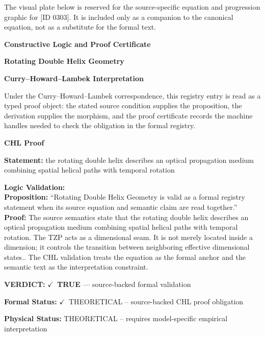 \begingroup\footnotesize\sloppy
The visual plate below is reserved for the source-specific equation and progression graphic for [ID 0303]. It is included only as a companion to the canonical equation, not as a substitute for the formal text.
\par\endgroup
\ifTZPDarkEdition
{}
\fi

\clearpage
\begingroup\tzpsupportsetup
\noindent\textbf{\fontsize{10.8pt}{12.8pt}\selectfont [ID 0303] Constructive Logic and Proof Certificate}\par
\noindent\textbf{\fontsize{10pt}{12pt}\selectfont Rotating Double Helix Geometry}\par
\vspace{0.45em}
\begingroup
\footnotesize
\setlength{\parskip}{0.22em}
\setlength{\parindent}{0pt}
\noindent\textbf{Curry--Howard--Lambek Interpretation}\par
Under the Curry--Howard--Lambek correspondence, this registry entry is read as a typed proof
object: the stated source condition supplies the proposition, the derivation supplies the
morphism, and the proof certificate records the machine handles needed to check the obligation
in the formal registry.

\vspace{0.45em}
\noindent\textbf{CHL Proof}\par
\textbf{Statement:} the rotating double helix describes an optical propagation medium combining spatial
helical paths with temporal rotation

\textbf{Logic Validation:}\\
\textbf{Proposition:} ``Rotating Double Helix Geometry is valid as a formal registry statement when its source
equation and semantic claim are read together.''\\
\textbf{Proof:} The source semantics state that the rotating double helix describes an optical
propagation medium combining spatial helical paths with temporal rotation. The TZP acts
as a dimensional seam. It is not merely located inside a dimension; it controls the
transition between neighboring effective dimensional states.. The CHL validation treats
the equation as the formal anchor and the semantic text as the interpretation
constraint.

\textbf{VERDICT:} \ensuremath{\checkmark}\ \textbf{TRUE} --- source-backed formal validation

\textbf{Formal Status:} \ensuremath{\checkmark}\ THEORETICAL -- source-backed CHL proof obligation

\textbf{Physical Status:} THEORETICAL -- requires model-specific empirical interpretation
\par\vspace{0.45em}
\par
\ifTZPDarkEdition
{}
\fi
\endgroup
\endgroup
